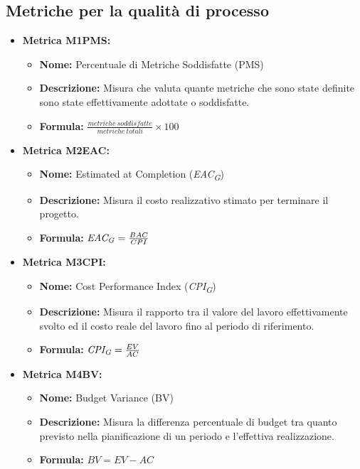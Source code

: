 \subsection{Metriche per la qualità di processo}
\begin{itemize}
    \item \textbf{Metrica M1PMS:}
           \begin{itemize}
            \item \textbf{Nome:} Percentuale di Metriche Soddisfatte (PMS)
            \item \textbf{Descrizione:} Misura che valuta quante metriche che sono state definite sono state effettivamente adottate o soddisfatte.
            \item \textbf{Formula:} $\frac{metriche \ soddisfatte}{metriche \ totali}\times 100$
           \end{itemize}

    \item \textbf{Metrica M2EAC:}
          \begin{itemize}
              \item \textbf{Nome:} Estimated at Completion (\textit{EAC}\textsubscript{\textit{G}})
              \item \textbf{Descrizione:} Misura il costo realizzativo stimato per terminare il progetto.
              \item \textbf{Formula:} $\textit{EAC}\textsubscript{\textit{G}} = \frac{BAC}{CPI}$
          \end{itemize}

    \item \textbf{Metrica M3CPI:}
          \begin{itemize}
              \item \textbf{Nome:} Cost Performance Index (\textit{CPI}\textsubscript{\textit{G}})
              \item \textbf{Descrizione:} Misura il rapporto tra il valore del lavoro effettivamente svolto ed il costo reale del lavoro fino al periodo di riferimento.
              \item \textbf{Formula:} $\textit{CPI}\textsubscript{\textit{G}} = \frac{EV}{AC}$
          \end{itemize}

    \item \textbf{Metrica M4BV:}
          \begin{itemize}
              \item \textbf{Nome:} Budget Variance (BV)
              \item \textbf{Descrizione:} Misura la differenza percentuale di budget tra quanto previsto nella pianificazione di un periodo e l’effettiva realizzazione.
              \item \textbf{Formula:} $BV = EV - AC $
          \end{itemize}


\end{itemize}
